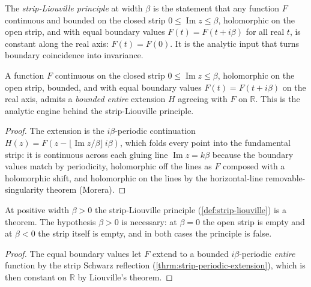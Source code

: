 \begin{definition}
    \label{def:strip-liouville}
    \leanok
    The \emph{strip-Liouville principle} at width $\beta$ is the statement that any function $F$ continuous and bounded on the closed strip $0 \le \operatorname{Im} z \le \beta$, holomorphic on the open strip, and with equal boundary values $F(t) = F(t + i\beta)$ for all real $t$, is constant along the real axis: $F(t) = F(0)$. It is the analytic input that turns boundary coincidence into invariance.
\end{definition}

\begin{theorem}
    \label{thrm:strip-periodic-extension}
    \leanok
    A function $F$ continuous on the closed strip $0 \le \operatorname{Im} z \le \beta$, holomorphic on the open strip, bounded, and with equal boundary values $F(t) = F(t + i\beta)$ on the real axis, admits a \emph{bounded entire} extension $H$ agreeing with $F$ on $\mathbb{R}$. This is the analytic engine behind the strip-Liouville principle.
\end{theorem}
\begin{proof}
    \leanok
    The extension is the $i\beta$-periodic continuation $H(z) = F\!\left(z - \lfloor \operatorname{Im} z / \beta \rfloor\, i\beta\right)$, which folds every point into the fundamental strip: it is continuous across each gluing line $\operatorname{Im} z = k\beta$ because the boundary values match by periodicity, holomorphic off the lines as $F$ composed with a holomorphic shift, and holomorphic on the lines by the horizontal-line removable-singularity theorem (Morera).
\end{proof}

\begin{theorem}
    \label{thrm:strip-liouville-pos}
    \leanok
    At positive width $\beta > 0$ the strip-Liouville principle (\ref{def:strip-liouville}) is a theorem. The hypothesis $\beta > 0$ is necessary: at $\beta = 0$ the open strip is empty and at $\beta < 0$ the strip itself is empty, and in both cases the principle is false.
\end{theorem}
\begin{proof}
    \leanok
    The equal boundary values let $F$ extend to a bounded $i\beta$-periodic \emph{entire} function by the strip Schwarz reflection (\ref{thrm:strip-periodic-extension}), which is then constant on $\mathbb{R}$ by Liouville's theorem.
\end{proof}

